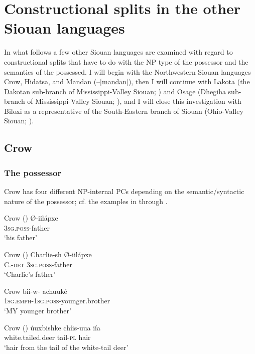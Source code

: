 \documentclass[output=paper]{LSP/langsci}
\begin{document}
\section{Constructional splits in the other Siouan languages}

In what follows a few other Siouan languages are examined with regard to constructional splits that have to do with the NP type of the possessor and the semantics of the possessed. I will begin with the Northwestern Siouan languages Crow, Hidatsa, and Mandan (--\ref{mandan}), then I will continue with Lakota (the Dakotan sub-branch of Mississippi-Valley Siouan; ) and Osage (Dhegiha sub-branch of Mississippi-Valley Siouan; ), and I will close this investigation with Biloxi as a representative of the South-Eastern branch of Siouan (Ohio-Valley Siouan; ).
 
\subsection{Crow}\label{sec:helmbrecht:4.1} \label{crow} 
\subsubsection{The possessor}
Crow has four different NP-internal PCs depending on the semantic/syntactic nature of the possessor; cf. the examples in  through . 

\ea Crow (\citealt[234]{Graczyk2007}) \label{crowfather}
\ex
\gll Ø-iilápxe \\
\textsc{3sg.poss}-father \\
\glt `his father'
\z
\z

\ea Crow (\citealt[234]{Graczyk2007}) \label{crowcharlie}
\ex
\gll Charlie-sh 		Ø-iilápxe \\
C.-\textsc{det}      \textsc{3sg.poss}-father \\
\glt `Charlie's father'
\z \z

\ea	Crow \citep[235]{Graczyk2007} \label{crowbrother}
\ex 
\gll bii-w- achuuké \\
\textsc{1sg.emph-1sg.poss}-younger.brother \\
\glt `MY younger brother'
\z \z

\ea Crow (\citealt[236]{Graczyk2007}) \label{crowdeer}
\ex 
\gll úuxbishke            chíis-uua iía \\
white.tailed.deer tail-\textsc{pl}      hair \\
\glt `hair from the tail of the white-tail deer'
\z \z
\end{document}
